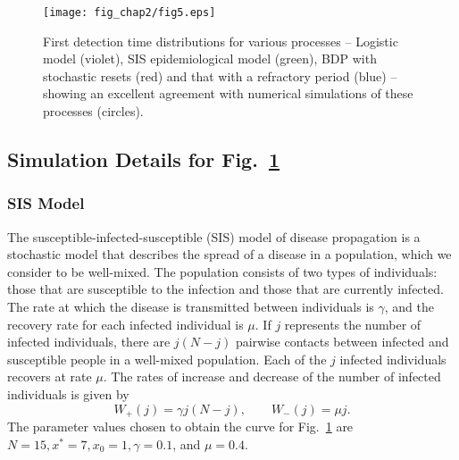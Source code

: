 \begin{figure}[h]
\centering
\texttt{[image: fig\_chap2/fig5.eps]}
\caption{First detection time distributions for various processes -- Logistic model (violet), SIS epidemiological model (green), BDP with stochastic resets (red) and that with a refractory period (blue) -- showing an excellent agreement with numerical simulations of these processes (circles).}
\label{fig:applns}
\end{figure}

\subsection*{Simulation Details for Fig.~\ref{fig:applns}}

\subsubsection*{SIS Model}
The susceptible-infected-susceptible (SIS) model \cite{wang2016statistical} of disease propagation is a stochastic model that describes the spread of a disease in a population, which we consider to be well-mixed. The population consists of two types of individuals: those that are susceptible to the infection and those that are currently infected. The rate at which the disease is transmitted between individuals is $\gamma$, and the recovery rate for each infected individual is $\mu$. If $j$ represents the number of infected individuals, there are $j(N-j)$ pairwise contacts between infected and susceptible people in a well-mixed population. Each of the $j$ infected individuals recovers at rate $\mu$. The rates of increase and decrease of the number of infected individuals is given by
 \begin{equation}
W_{+}(j) = \gamma j (N-j), \quad \quad W_-(j) = \mu j.
 \end{equation}
The parameter values chosen to obtain the curve for Fig.~\ref{fig:applns} are $N=15, x^*= 7, x_0 = 1, \gamma = 0.1$, and $\mu=0.4$.  




